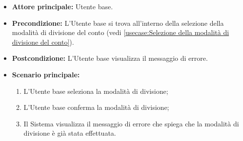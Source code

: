 \label{usecase:Modalità di divisione del conto già effettuata}
\begin{itemize}
	\item \textbf{Attore principale:} Utente base.

	\item \textbf{Precondizione:}
	      L'Utente base si trova all'interno della selezione della modalità di divisione del conto (vedi \autoref{usecase:Selezione della modalità di divisione del conto}).

	\item \textbf{Postcondizione:}
	      L'Utente base visualizza il messaggio di errore.

	\item \textbf{Scenario principale:}
	      \begin{enumerate}
		      \item L'Utente base seleziona la modalità di divisione;

		      \item L'Utente base conferma la modalità di divisione;

		      \item Il Sistema visualizza il messaggio di errore che spiega che
		            la modalità di divisione è già stata effettuata.
	      \end{enumerate}
\end{itemize}

